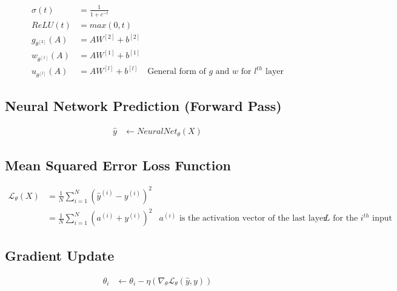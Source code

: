 \documentclass{article}
\begin{document}
\begin{equation}
	\begin{aligned}
		\sigma(t)           & = \frac{1}{1 + e^{-t}}                                                         \\
		ReLU(t)             & = max(0, t)                                                                    \\
		g_{\theta^{[2]}}(A) & = AW^{[2]} + {b}^{[2]}                                                         \\
		w_{\theta^{[1]}}(A) & = AW^{[1]} + {b}^{[1]}                                                         \\
		u_{\theta^{[l]}}(A) & = AW^{[l]} + b^{[l]}   & \text{General form of $g$ and $w$ for $l^{th}$ layer}
	\end{aligned}
\end{equation}

\subsection{Neural Network Prediction (Forward Pass)}
\begin{align}
	\hat{y} & \gets NeuralNet_\theta(X)
\end{align}

\subsection{Mean Squared Error Loss Function}
\begin{equation}
	\begin{aligned}
		\mathcal{L}_\theta(X) & =
		\frac{1}{N} \sum_{i=1}^{N}{ (\hat{y}^{(i)} - y^{(i)} )^{2}}                                                                                                            \\
		                      & = \frac{1}{N} \sum_{i=1}^{N}{(a^{(i)} + y^{(i)})^{2}} & \text{$a^{(i)}$ is the activation vector of the last layer $L$ for the $i^{th}$ input}
	\end{aligned}
\end{equation}

\subsection{Gradient Update}
\begin{align}
	\theta_i & \gets \theta_i - \eta (\nabla_\theta \mathcal{L}_{\theta}(\hat{y}, y))
\end{align}

\printbibliography
\end{document}
